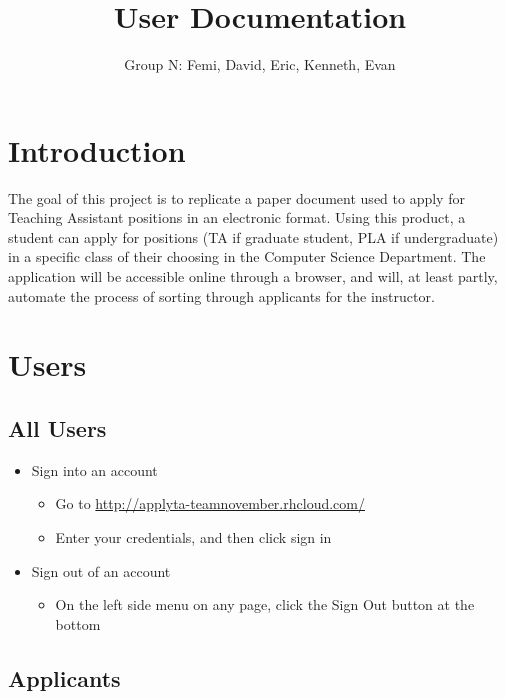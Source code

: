 \documentclass[11pt]{amsart}
\title{User Documentation}
\author{Group N: Femi, David, Eric, Kenneth, Evan}
\begin{document}
\maketitle
\section{Introduction}
\noindent The goal of this project is to replicate a paper document used to apply for Teaching Assistant positions in an electronic format. Using this product, a student can apply for positions (TA if graduate student, PLA if undergraduate) in a specific class of their choosing in the Computer Science Department. The application will be accessible online through a browser, and will, at least partly, automate the process of sorting through applicants for the instructor.
\section{Users}


\subsection{All Users}

\begin{itemize}
	\item{Sign into an account}
	\begin{itemize}
		\item{Go to \href{http://applyta-teamnovember.rhcloud.com/}{http://applyta-teamnovember.rhcloud.com/}}
		\item{Enter your credentials, and then click sign in}
	\end{itemize}
	\item{Sign out of an account}
	\begin{itemize}
		\item{On the left side menu on any page, click the Sign Out button at the bottom}
	\end{itemize}
\end{itemize}

\subsection{Applicants}
\end{document}

